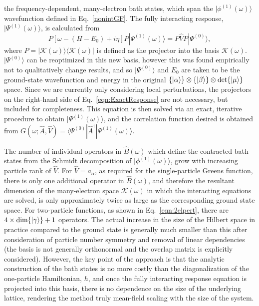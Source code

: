 \documentclass[aps,showpacs,twocolumn,nobibnotes]{revtex4}
\begin{document}
the frequency-dependent, many-electron bath states, which span the $|\phi^{(1)}(\omega) \rangle$ wavefunction defined in Eq.~\ref{nonintGF}.
The fully interacting response, $|\Psi^{(1)}(\omega) \rangle$, is calculated from
\begin{equation}
    P \left[ \omega - (H-E_0) + i \eta \right] P | \Psi^{(1)}(\omega) \rangle = P {\hat V} P |\Psi^{(0)} \rangle   ,   \label{eqn:ExactResponse}
\end{equation}
where $P=|\mathcal{K}(\omega) \rangle \langle \mathcal{K}(\omega) |$ is defined as the projector into the basis $\mathcal{K}(\omega)$. 
$|\Psi^{(0)} \rangle$ can be reoptimized in this new basis, however this was found empirically not to qualitatively change results, and 
so $|\Psi^{(0)}\rangle$ and $E_0$ are taken to be the ground-state wavefunction and energy in the 
original $\{|\alpha \rangle \} \otimes \{ |\beta \rangle \} \otimes \text{\textnormal {det}} \{ | \mu \rangle \} $ space. 
Since we are currently only considering local perturbations,
the projectors on the right-hand side of Eq.~\ref{eqn:ExactResponse} are not necessary, but included for completeness.
This equation is then solved via an exact, iterative procedure to obtain $| \Psi^{(1)}(\omega) \rangle$, and the correlation function desired is obtained from 
$G(\omega;{\hat A},{\hat V})=\langle \Psi^{(0)} | {\hat A}^{\dagger} | \Psi^{(1)}(\omega) \rangle$.

The number of individual operators in ${\hat B}(\omega)$ which define the contracted bath states from the Schmidt decomposition 
of $|\phi^{(1)}(\omega) \rangle$, grow with increasing particle rank of ${\hat V}$. For ${\hat V}=a_{\alpha}$, as required for the single-particle Greens function,
there is only one additional operator in ${\hat B}(\omega)$, and therefore the resultant dimension of the many-electron space $\mathcal{K}(\omega)$ in 
which the interacting equations are solved, is only approximately twice as large as the corresponding ground state space. For two-particle functions,
as shown in Eq.~\ref{eqn:2elpert}, there are $4 \times \text{\textnormal {dim}}\{|\gamma \rangle \} + 1$ operators. The actual increase in the size of the Hilbert
space in practice compared to the ground state is generally much smaller than this after consideration of particle number symmetry and removal of linear
dependencies (the basis is not generally orthonormal and the overlap matrix is explicitly considered). However, the key point of the 
approach is that the analytic construction of the bath states is no more costly than the diagonalization of the one-particle Hamiltonian, $h$, and once the
fully interacting response equation is projected into this basis, there is no dependence on the size of the underlying lattice, rendering the method
truly mean-field scaling with the size of the system. 
\end{document}
